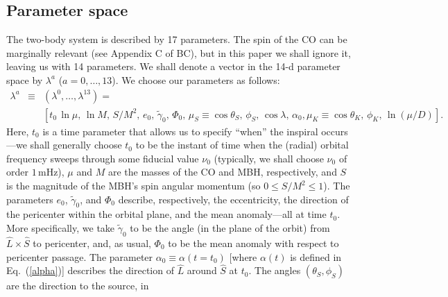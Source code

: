 \documentclass[11pt]{report}
\begin{document}
\subsection{Parameter space}
The two-body system is described by 17 parameters. The spin of the
CO can be marginally relevant (see Appendix C of BC), but in this paper
we shall ignore it, leaving us with 14 parameters.
We shall denote a vector in the 14-d parameter space by $\lambda^a$
($a=0,\ldots,13$).
We choose our parameters as follows:
\begin{eqnarray} \label{lambda}
\lambda^a &\equiv& (\lambda^0,\ldots,\lambda^{13}) =\nonumber\\
&&
\left[t_0\,\ln\mu,\,\ln M,\,S/M^2,\,e_0,\,\tilde\gamma_0,\,\Phi_0,\,
\mu_S\equiv\cos\theta_S,\,\phi_S,\,\cos\lambda,\,\alpha_0,
\mu_K\equiv\cos\theta_K,\,\phi_K,\,\ln(\mu/D)\right].
\end{eqnarray}
Here, $t_0$ is a time parameter that allows us to specify ``when''
the inspiral occurs---we shall generally choose $t_0$ to be the instant of
time when the (radial) orbital frequency sweeps through
some fiducial value $\nu_0$ (typically, we shall choose $\nu_0$ of
order $1\,$mHz),
$\mu$ and $M$ are the masses of the CO and MBH, respectively, and $S$ is the
magnitude of the MBH's spin angular momentum (so $0 \le S/M^2 \le 1$).
The parameters $e_0$, $\tilde\gamma_0$, and $\Phi_0$ describe,
respectively, the eccentricity, the direction of the pericenter within
the orbital plane, and the mean anomaly---all at time $t_0$.
More specifically, we take $\tilde\gamma_0$ to be the angle (in the plane
of the orbit) from $\hat L \times \hat S$ to pericenter, and, as usual,
$\Phi_0$ to be the mean anomaly with respect to pericenter passage.
The parameter $\alpha_0\equiv\alpha(t=t_0)$ [where $\alpha(t)$
is defined in Eq.~(\ref{alpha})] describes the direction
of $\hat L$ around $\hat S$ at $t_0$.
The angles $(\theta_S,\phi_S)$ are the direction to the source, in
\end{document}
